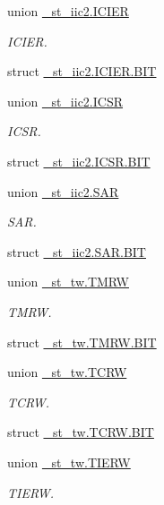 \begin{DoxyCompactItemize}
\item 
union \hyperlink{3694s_8h_de/df7/union__st__iic2_8ICIER}{\+\_\+st\+\_\+iic2.\+I\+C\+I\+E\+R}
\begin{DoxyCompactList}\small\item\em I\+C\+I\+E\+R. \end{DoxyCompactList}\item 
struct \hyperlink{3694s_8h_da/d6c/struct__st__iic2_8ICIER_8BIT}{\+\_\+st\+\_\+iic2.\+I\+C\+I\+E\+R.\+B\+I\+T}
\item 
union \hyperlink{3694s_8h_dd/d85/union__st__iic2_8ICSR}{\+\_\+st\+\_\+iic2.\+I\+C\+S\+R}
\begin{DoxyCompactList}\small\item\em I\+C\+S\+R. \end{DoxyCompactList}\item 
struct \hyperlink{3694s_8h_dc/d5d/struct__st__iic2_8ICSR_8BIT}{\+\_\+st\+\_\+iic2.\+I\+C\+S\+R.\+B\+I\+T}
\item 
union \hyperlink{3694s_8h_d1/d9d/union__st__iic2_8SAR}{\+\_\+st\+\_\+iic2.\+S\+A\+R}
\begin{DoxyCompactList}\small\item\em S\+A\+R. \end{DoxyCompactList}\item 
struct \hyperlink{3694s_8h_dc/df7/struct__st__iic2_8SAR_8BIT}{\+\_\+st\+\_\+iic2.\+S\+A\+R.\+B\+I\+T}
\item 
union \hyperlink{3694s_8h_dd/d12/union__st__tw_8TMRW}{\+\_\+st\+\_\+tw.\+T\+M\+R\+W}
\begin{DoxyCompactList}\small\item\em T\+M\+R\+W. \end{DoxyCompactList}\item 
struct \hyperlink{3694s_8h_d3/d31/struct__st__tw_8TMRW_8BIT}{\+\_\+st\+\_\+tw.\+T\+M\+R\+W.\+B\+I\+T}
\item 
union \hyperlink{3694s_8h_d2/d54/union__st__tw_8TCRW}{\+\_\+st\+\_\+tw.\+T\+C\+R\+W}
\begin{DoxyCompactList}\small\item\em T\+C\+R\+W. \end{DoxyCompactList}\item 
struct \hyperlink{3694s_8h_d2/dd5/struct__st__tw_8TCRW_8BIT}{\+\_\+st\+\_\+tw.\+T\+C\+R\+W.\+B\+I\+T}
\item 
union \hyperlink{3694s_8h_dd/d15/union__st__tw_8TIERW}{\+\_\+st\+\_\+tw.\+T\+I\+E\+R\+W}
\begin{DoxyCompactList}\small\item\em T\+I\+E\+R\+W. \end{DoxyCompactList}\item 

\end{DoxyCompactItemize}
